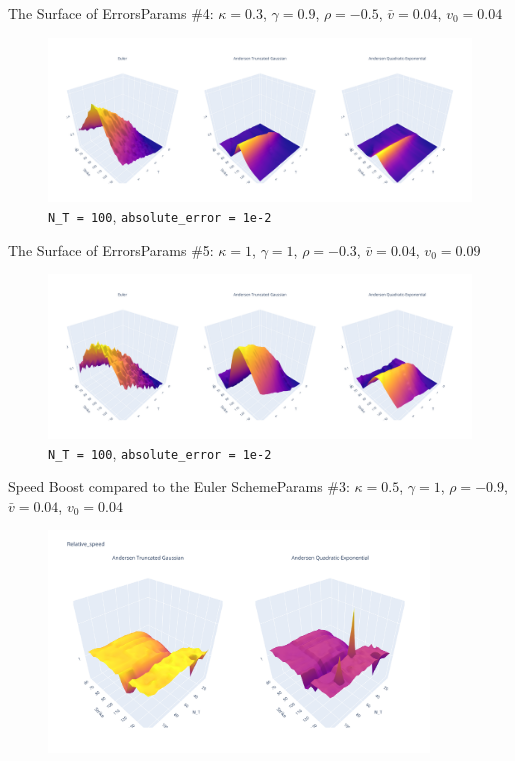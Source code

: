 \begin{frame}{The Surface of Errors}{Params \#4: $\kappa = 0.3$, $\gamma = 0.9$, $\rho = -0.5$, $\bar v = 0.04$, $v_0 = 0.04$}
    \begin{figure}
        \includegraphics[width=\textwidth]{part4/pictures/err_surface_strike_T_N_T=100_param4.pdf}
        \caption{\texttt{N\_T = 100}, \texttt{absolute\_error = 1e-2}}
    \end{figure}
\end{frame}

\begin{frame}{The Surface of Errors}{Params \#5: $\kappa = 1$, $\gamma = 1$, $\rho = -0.3$, $\bar v = 0.04$, $v_0 = 0.09$}
    \begin{figure}
        \includegraphics[width=\textwidth]{part4/pictures/err_surface_strike_T_N_T=100_param5.pdf}
        \caption{\texttt{N\_T = 100}, \texttt{absolute\_error = 1e-2}}
    \end{figure}
\end{frame}

\begin{frame}{Speed Boost compared to the Euler Scheme}{Params \#3: $\kappa = 0.5$, $\gamma = 1$, $\rho = -0.9$, $\bar v = 0.04$, $v_0 = 0.04$}
    \begin{figure}
        \includegraphics[width=0.9\textwidth]{part4/pictures/relative_speed_strike_N_T.pdf}
    \end{figure}
\end{frame}


